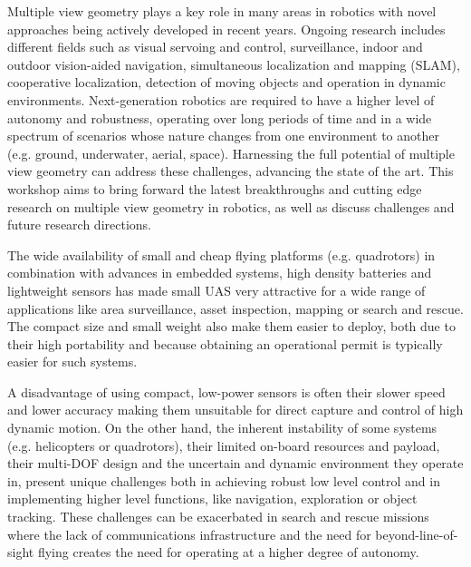 \begin{spacing}{1.0}
{
Multiple view geometry plays a key role in many areas in robotics with novel approaches being actively developed in recent years. Ongoing research includes different fields such as visual servoing and control, surveillance, indoor and outdoor vision-aided navigation, simultaneous localization and mapping (SLAM), cooperative localization, detection of moving objects and operation in dynamic environments. Next-generation robotics are required to have a higher level of autonomy and robustness, operating over long periods of time and in a wide spectrum of scenarios whose nature changes from one environment to another (e.g. ground, underwater, aerial, space). Harnessing the full potential of multiple view geometry can address these challenges, advancing the state of the art.  This workshop aims to bring forward the latest breakthroughs and cutting edge research on multiple view geometry in robotics, as well as discuss challenges and future research directions. 
}



{
 The wide availability of small and cheap flying platforms (e.g. quadrotors) in combination with advances in embedded systems, high density batteries and lightweight sensors has made small UAS very attractive for a wide range of applications like area surveillance, asset inspection, mapping or search and rescue. The compact size and small weight also make them easier to deploy, both due to their high portability and because obtaining an operational permit is typically easier for such systems.
 
A disadvantage of using compact, low-power sensors is often their slower speed and lower accuracy making them unsuitable for direct capture and control of high dynamic motion. On the other hand, the inherent instability of some systems (e.g. helicopters or quadrotors), their limited on-board resources and payload, their multi-DOF design and the uncertain and dynamic environment they operate in, present unique challenges both in achieving robust low level control and in implementing higher level functions, like navigation, exploration or object tracking. These challenges can be exacerbated in search and rescue missions where the lack of communications infrastructure and the need for beyond-line-of-sight flying creates the need for operating at a higher degree of autonomy.

}
\end{spacing}
